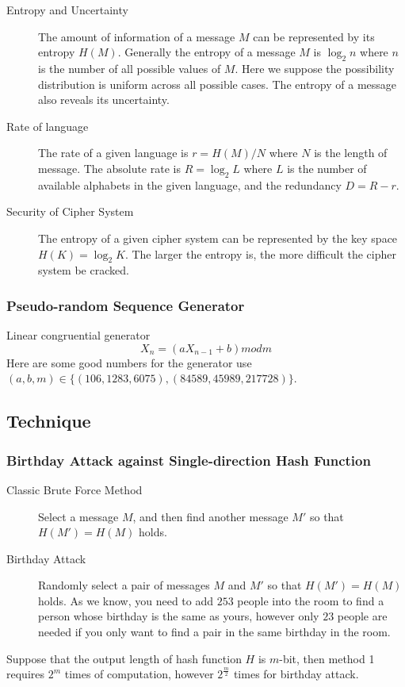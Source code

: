 \begin{description}
\item[Entropy and Uncertainty]
 The amount of information of a message $M$ can be represented by its entropy $H(M)$.
 Generally the entropy of a message $M$ is $\log_2 n$ where $n$ is the number of all
 possible values of $M$. Here we suppose the possibility distribution is uniform
 across all possible cases. The entropy of a message also reveals its uncertainty.
\item[Rate of language]
 The rate of a given language is $r = H(M)/N$ where $N$ is the length of message.
 The absolute rate is $R = \log_2 L$ where $L$ is the number of available alphabets
 in the given language, and the redundancy $D = R - r$.
\item[Security of Cipher System]
 The entropy of a given cipher system can be represented by the key space $H(K)=\log_2 K$.
 The larger the entropy is, the more difficult the cipher system be cracked.
\end{description}

\subsubsection{Pseudo-random Sequence Generator}
Linear congruential generator
$$ X_n = (aX_{n-1}+b)mod m $$
Here are some good numbers for the generator use $(a,b,m) \in \{(106,1283,6075), (84589,45989,217728)\}$.

\subsection{Technique}

\subsubsection{Birthday Attack against Single-direction Hash Function}
\begin{description}
\item[Classic Brute Force Method] Select a message $M$, and then find another message $M'$ so that
  $H(M') = H(M)$ holds.
\item[Birthday Attack] Randomly select a pair of messages $M$ and $M'$ so that $H(M') = H(M)$ holds.
  As we know, you need to add $253$ people into the room to find a person whose birthday is the same
  as yours, however only $23$ people are needed if you only want to find a pair in the same birthday in the room.
\end{description}
Suppose that the output length of hash function $H$ is $m$-bit, then
method 1 requires $2^m$ times of computation, however $2^{\frac{m}{2}}$ times for birthday attack.

